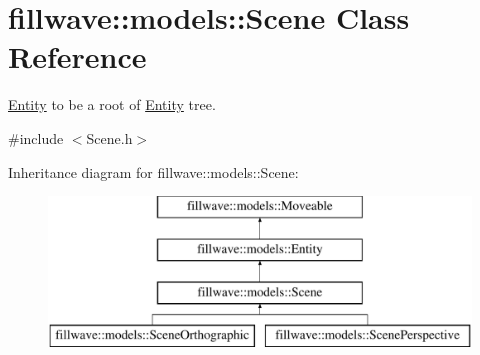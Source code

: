 \hypertarget{classfillwave_1_1models_1_1Scene}{}\section{fillwave\+:\+:models\+:\+:Scene Class Reference}
\label{classfillwave_1_1models_1_1Scene}


\hyperlink{classfillwave_1_1models_1_1Entity}{Entity} to be a root of \hyperlink{classfillwave_1_1models_1_1Entity}{Entity} tree.  




{\ttfamily \#include $<$Scene.\+h$>$}

Inheritance diagram for fillwave\+:\+:models\+:\+:Scene\+:\begin{figure}[H]
\begin{center}
\leavevmode
\includegraphics[height=4.000000cm]{classfillwave_1_1models_1_1Scene}
\end{center}
\end{figure}
